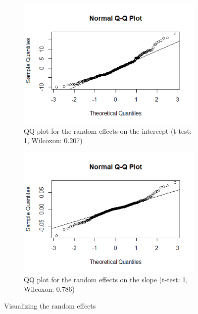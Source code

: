 \begin{figure}[H]
\begin{subfigure}{.5\textwidth}
  \centering
  \includegraphics[width=1\linewidth]{../../plots/qq_intercept.png}
  \caption{QQ plot for the random effects on the intercept (t-test: 1, Wilcoxon: 0.207)}
\end{subfigure}
\begin{subfigure}{.5\textwidth}
  \centering
  \includegraphics[width=1\linewidth]{../../plots/qq_slope.png}
  \caption{QQ plot for the random effects on the slope (t-test: 1, Wilcoxon: 0.786)}
\end{subfigure}
\caption{Visualizing the random effects}
\label{fig:re}
\end{figure}

